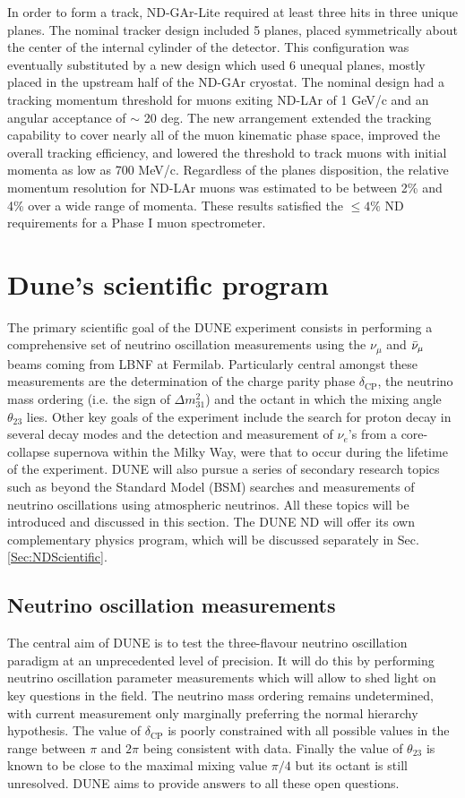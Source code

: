 In order to form a track, ND-GAr-Lite required at least three hits in three unique planes. The nominal tracker design included 5 planes, placed symmetrically about the center of the internal cylinder of the detector. This configuration was eventually substituted by a new design which used 6 unequal planes, mostly placed in the upstream half of the ND-GAr cryostat. The nominal design had a tracking momentum threshold for muons exiting ND-LAr of 1 GeV/c and an angular acceptance of $\sim$ 20 deg. The new arrangement extended the tracking capability to cover nearly all of the muon kinematic phase space, improved the overall tracking efficiency, and lowered the threshold to track muons with initial momenta as low as 700 MeV/c. Regardless of the planes disposition, the relative momentum resolution for ND-LAr muons was estimated to be between 2\% and 4\% over a wide range of momenta. These results satisfied the $\leq 4\%$ ND requirements for a Phase I muon spectrometer.  

\section{Dune's scientific program}
\label{Sec:DUNEscientific}
The primary scientific goal of the DUNE experiment consists in performing a comprehensive set of neutrino oscillation measurements using the $\nu_\mu$ and $\Bar{\nu}_\mu$ beams coming from LBNF at Fermilab. Particularly central amongst these measurements are the determination of the charge parity phase $\delta_\text{CP}$, the neutrino mass ordering (i.e. the sign of $\Delta m_{31}^2$) and the octant in which the mixing angle $\theta_{23}$ lies. Other key goals of the experiment include the search for proton decay in several decay modes and the detection and measurement of $\nu_e$'s from a core-collapse supernova within the Milky Way, were that to occur during the lifetime of the experiment. DUNE will also pursue a series of secondary research topics such as beyond the Standard Model (BSM) searches and measurements of neutrino oscillations using atmospheric neutrinos. All these topics will be introduced and discussed in this section. The DUNE ND will offer its own complementary physics program, which will be discussed separately in Sec. \ref{Sec:NDScientific}.


\subsection{Neutrino oscillation measurements}
The central aim of DUNE is to test the three-flavour neutrino oscillation paradigm at an unprecedented level of precision. It will do this by performing neutrino oscillation parameter measurements which will allow to shed light on key questions in the field. The neutrino mass ordering remains undetermined, with current measurement only marginally preferring the normal hierarchy hypothesis.  The value of $\delta_\textrm{CP}$ is poorly constrained with all possible values in the range between $\pi$ and $2\pi$ being consistent with data. Finally the value of $\theta_{23}$ is known to be close to the maximal mixing value $\pi/4$ but its octant is still unresolved. DUNE aims to provide answers to all these open questions.

